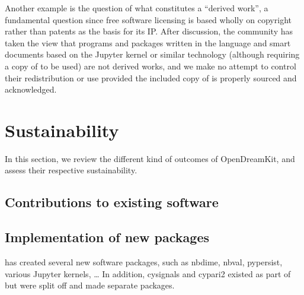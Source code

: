 \documentclass{deliverablereport}
\begin{document}
Another example is the question of what constitutes a ``derived
work'', a fundamental question since free software licensing is based
wholly on copyright rather than patents as the basis for its IP. After
discussion, the \GAP community has taken the view that programs and
packages written in the \GAP language and smart documents based on
the \GAP Jupyter kernel or similar technology (although requiring a copy of
\GAP to be used) are not derived works, and we make no attempt to control
their redistribution or use  provided the included copy of \GAP is
properly sourced and acknowledged.





\section{Sustainability}

In this section, we review the different kind of outcomes of
OpenDreamKit, and assess their respective sustainability.

\subsection{Contributions to existing software}


\TODO{}

\subsection{Implementation of new packages}

\ODK has created several new software packages,
such as nbdime, nbval, pypersist, various Jupyter kernels, \ldots
In addition, cysignals and cypari2 existed as part of \Sage but were split
off and made separate packages.
\end{document}
